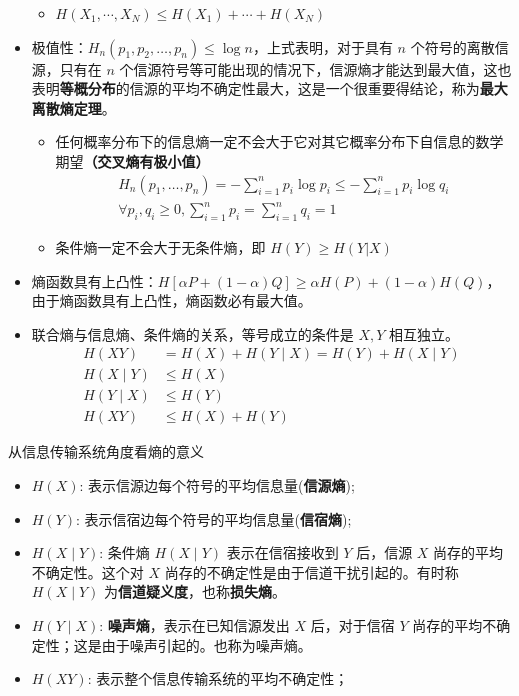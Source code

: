 \begin{remark}
\begin{itemize}
\begin{itemize}
            \item $H(X_1, \cdots, X_N) \le H(X_1) + \cdots + H(X_N)$
        \end{itemize}
        \item 极值性：$H_{n}(p_{1}, p_{2}, \dots, p_{n}) \leq \log n$，上式表明，对于具有 $n$ 个符号的离散信源，只有在 $n$ 个信源符号等可能出现的情况下，信源熵才能达到最大值，这也表明\textbf{等概分布}的信源的平均不确定性最大，这是一个很重要得结论，称为\textbf{最大离散熵定理}。\begin{itemize}
            \item 任何概率分布下的信息熵一定不会大于它对其它概率分布下自信息的数学期望\textbf{（交叉熵有极小值）}\begin{gather*}
                H_n(p_1, \dots, p_n) = -\sum_{i = 1}^n p_i\log p_i \le -\sum_{i = 1}^n p_i\log q_i \\
                \forall p_i, q_i \ge 0, \sum_{i = 1}^n p_i = \sum_{i = 1}^n q_i = 1
            \end{gather*}
            \item 条件熵一定不会大于无条件熵，即 $H(Y) \ge H(Y | X)$
        \end{itemize}
        \item 熵函数具有上凸性：$H[\alpha P + (1 - \alpha)Q] \ge \alpha H(P) + (1 - \alpha)H(Q)$，由于熵函数具有上凸性，熵函数必有最大值。
        \item 联合熵与信息熵、条件熵的关系，等号成立的条件是 $X,Y$ 相互独立。\begin{align*}
            H(X Y)&=H(X)+H(Y \mid X)=H(Y)+H(X \mid Y) \\
            H(X \mid Y) &\leq H(X) \\ 
            H(Y \mid X) &\leq H(Y) \\
            H(X Y) &\leq H(X)+H(Y) 
        \end{align*}
    \end{itemize}
\end{remark}

\begin{remark}
    从信息传输系统角度看熵的意义\begin{itemize}
        \item $H(X)$: 表示信源边每个符号的平均信息量(\textbf{信源熵});
        \item $H(Y)$: 表示信宿边每个符号的平均信息量(\textbf{信宿熵});
        \item $H(X \mid Y)$: 条件熵 $H(X \mid Y)$ 表示在信宿接收到 $Y$ 后，信源 $X$ 尚存的平均不确定性。这个对 $X$ 尚存的不确定性是由于信道干扰引起的。有时称 $H(X\mid Y)$ 为\textbf{信道疑义度}，也称\textbf{损失熵}。
        \item $H(Y \mid X)$: \textbf{噪声熵}，表示在已知信源发出 $X$ 后，对于信宿 $Y$ 尚存的平均不确定性；这是由于噪声引起的。也称为噪声熵。
        \item $H(XY)$: 表示整个信息传输系统的平均不确定性；
    \end{itemize}
    
\end{remark}

